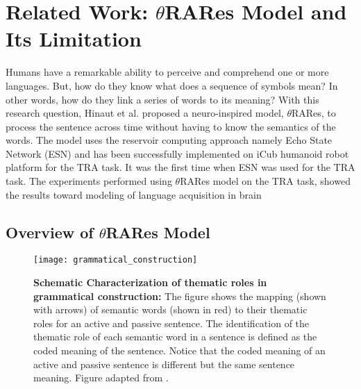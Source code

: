 \chapter{Related Work: $\theta$RARes Model and Its Limitation}\label{issues}

Humans have a remarkable ability to perceive and comprehend one or more languages. But, how do they know what does a sequence of symbols mean? In other words, how do they link a series of words to its meaning? With this research question, Hinaut et al. \cite{xavier:2013:RT} proposed a neuro-inspired model, $\theta$RARes, to process the sentence across time without having to know the semantics of the words. The model uses the reservoir computing approach namely Echo State Network (ESN) and has been successfully implemented on iCub humanoid robot platform \cite{tra:xavier_hri} for the TRA task. It was the first time when ESN was used for the TRA task. The experiments performed using $\theta$RARes model on the TRA task, showed the results toward modeling of language acquisition in brain \cite{tra:xavier_wermter:2014, xavier:2013:RT}

\section{Overview of $\theta$RARes Model}\label{sec:xavier_model}

\begin{figure}[hbtp]
\centering
\texttt{[image: grammatical\_construction]}
\caption[Schematic characterization of TRA in grammatical construction.]{\textbf{Schematic Characterization of thematic roles in grammatical construction:} {\small The figure shows the mapping (shown with arrows) of semantic words (shown in red) to their thematic roles for an active and passive sentence. The identification of the thematic role of each semantic word in a sentence is defined as the coded meaning of the sentence. Notice that the coded meaning of an active and passive sentence is different but the same sentence meaning. Figure adapted from \cite{xavier:2013:RT}.}} 
\label{fig:tra_gc}
\end{figure}


